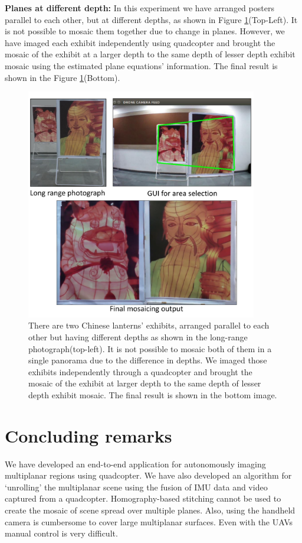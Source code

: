 \textbf{Planes at different depth:} In this experiment we have arranged posters
parallel to each other, but at different depths, as shown in Figure
\ref{fig:resultFrontBack}(Top-Left). It is not possible to mosaic them together
due to change in planes. However, we have imaged each exhibit independently
using quadcopter and brought the mosaic of the exhibit at a larger depth to the same depth
of lesser depth exhibit mosaic using the estimated plane equations' information.
The final result is shown in the Figure \ref{fig:resultFrontBack}(Bottom).
\begin{figure}
\centering
\includegraphics[width=0.9\textwidth]{figures/multiplanar/frontback.pdf}
\caption{There are two Chinese lanterns' exhibits, arranged parallel
to each other but having different depths as shown in the long-range
photograph(top-left). It is not possible to mosaic both of them in a single
panorama due to the difference in depths. We imaged those exhibits
independently through a quadcopter and brought the mosaic of the exhibit at larger
depth to the same depth of lesser depth exhibit mosaic. The final result is
shown in the bottom image.}
\label{fig:resultFrontBack}
\end{figure}

\section{Concluding remarks}
We have developed an end-to-end application for autonomously imaging multiplanar
regions using quadcopter. We have also developed an algorithm for `unrolling'
the multiplanar scene using the fusion of IMU data and video captured from
a quadcopter. Homography-based stitching cannot be used to create the mosaic of
scene spread over multiple planes. Also, using the handheld camera is cumbersome
to cover large multiplanar surfaces. Even with the UAVs manual control is very difficult.

